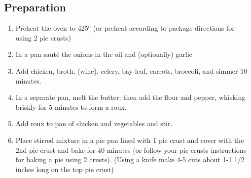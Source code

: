 \subsection{Preparation}
\begin{enumerate}
    \item Preheat the oven to 425$^o$ (or preheat according to package directions for using 2 pie crusts)
    \item In a pan saut\'{e} the onions in the oil and (optionally) garlic
    \item Add chicken, broth, (wine), celery, bay leaf, carrots, broccoli, and simmer 10 minutes.  
    \item In a separate pan, melt the butter; then add the flour and pepper, whisking briskly for 5 minutes to form a roux.
    \item Add roux to pan of chicken and vegetables and stir.
    \item Place stirred mixture in a pie pan lined with 1 pie crust and cover
          with the 2nd pie crust and bake for 40 minutes (or follow your pie
          crusts instructions for baking a pie using 2 crusts). (Using a knife
          make  4-5 cuts about 1-1 1/2 inches long on the top pie crust)
\end{enumerate}
